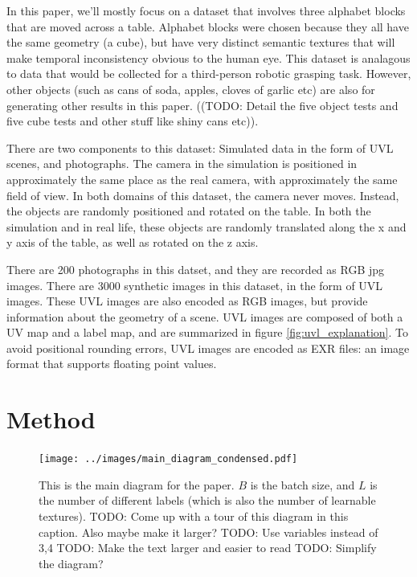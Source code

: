 \documentclass{article}
\begin{document}
In this paper, we'll mostly focus on a dataset that involves three alphabet blocks that are moved across a table.
Alphabet blocks were chosen because they all have the same geometry (a cube), but have very distinct semantic textures that will make temporal inconsistency obvious to the human eye.
This dataset is analagous to data that would be collected for a third-person robotic grasping task.
However, other objects (such as cans of soda, apples, cloves of garlic etc) are also for generating other results in this paper. ((TODO: Detail the five object tests and five cube tests and other stuff like shiny cans etc)).

There are two components to this dataset: Simulated data in the form of UVL scenes, and photographs.
The camera in the simulation is positioned in approximately the same place as the real camera, with approximately the same field of view.
In both domains of this dataset, the camera never moves. Instead, the objects are randomly positioned and rotated on the table.
In both the simulation and in real life, these objects are randomly translated along the x and y axis of the table, as well as rotated on the z axis.

There are 200 photographs in this datset, and they are recorded as RGB jpg images.
There are 3000 synthetic images in this dataset, in the form of UVL images.
These UVL images are also encoded as RGB images, but provide information about the geometry of a scene.
UVL images are composed of both a UV map and a label map, and are summarized in figure \ref{fig:uvl_explanation}.
To avoid positional rounding errors, UVL images are encoded as EXR files: an image format that supports floating point values.


\section{Method}
\label{sec:text}

\begin{figure}[H]
	\begin{center}
		\texttt{[image: ../images/main\_diagram\_condensed.pdf]}
	\end{center}
	\caption{
		This is the main diagram for the paper. $B$ is the batch size, and $L$ is the number of different labels (which is also the number of learnable textures).
		TODO: Come up with a tour of this diagram in this caption. Also maybe make it larger?
		TODO: Use variables instead of 3,4
		TODO: Make the text larger and easier to read
		TODO: Simplify the diagram?
	}
	\label{fig:main_diagram}
\end{figure}
\end{document}
